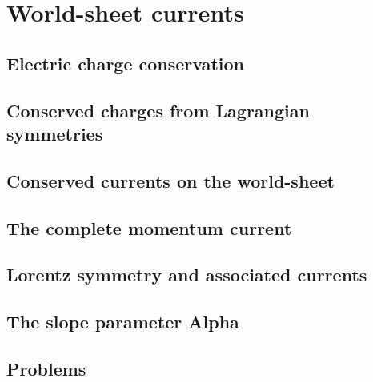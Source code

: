 \documentclass[12pt]{report}
\begin{document}
\chapter{World-sheet currents}
\newpage
\section{Electric charge conservation}
\section{Conserved charges from Lagrangian symmetries}
\section{Conserved currents on the world-sheet}
\section{The complete momentum current}
\section{Lorentz symmetry and associated currents}
\section{The slope parameter Alpha}
\section{Problems}
\end{document}
